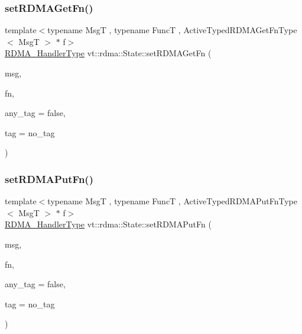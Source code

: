 \mbox{\label{structvt_1_1rdma_1_1_state_ae44026106376eb1542f36c8549f139da}} 
\subsubsection{\texorpdfstring{set\+R\+D\+M\+A\+Get\+Fn()}{setRDMAGetFn()}}
{\footnotesize\ttfamily template$<$typename MsgT , typename FuncT , Active\+Typed\+R\+D\+M\+A\+Get\+Fn\+Type$<$ Msg\+T $>$ $\ast$ f$>$ \\
\hyperlink{namespacevt_a9530efb893c0f3846e8ac5f0507e0f49}{R\+D\+M\+A\+\_\+\+Handler\+Type} vt\+::rdma\+::\+State\+::set\+R\+D\+M\+A\+Get\+Fn (\begin{DoxyParamCaption}\item[{MsgT $\ast$}]{msg,  }\item[{FuncT const \&}]{fn,  }\item[{bool const \&}]{any\+\_\+tag = {\ttfamily false},  }\item[{\hyperlink{namespacevt_a84ab281dae04a52a4b243d6bf62d0e52}{Tag\+Type} const \&}]{tag = {\ttfamily no\+\_\+tag} }\end{DoxyParamCaption})}

\mbox{\label{structvt_1_1rdma_1_1_state_a08999d62a472684b1f67a4da6d26fcb4}} 
\subsubsection{\texorpdfstring{set\+R\+D\+M\+A\+Put\+Fn()}{setRDMAPutFn()}}
{\footnotesize\ttfamily template$<$typename MsgT , typename FuncT , Active\+Typed\+R\+D\+M\+A\+Put\+Fn\+Type$<$ Msg\+T $>$ $\ast$ f$>$ \\
\hyperlink{namespacevt_a9530efb893c0f3846e8ac5f0507e0f49}{R\+D\+M\+A\+\_\+\+Handler\+Type} vt\+::rdma\+::\+State\+::set\+R\+D\+M\+A\+Put\+Fn (\begin{DoxyParamCaption}\item[{MsgT $\ast$}]{msg,  }\item[{FuncT const \&}]{fn,  }\item[{bool const \&}]{any\+\_\+tag = {\ttfamily false},  }\item[{\hyperlink{namespacevt_a84ab281dae04a52a4b243d6bf62d0e52}{Tag\+Type} const \&}]{tag = {\ttfamily no\+\_\+tag} }\end{DoxyParamCaption})}

